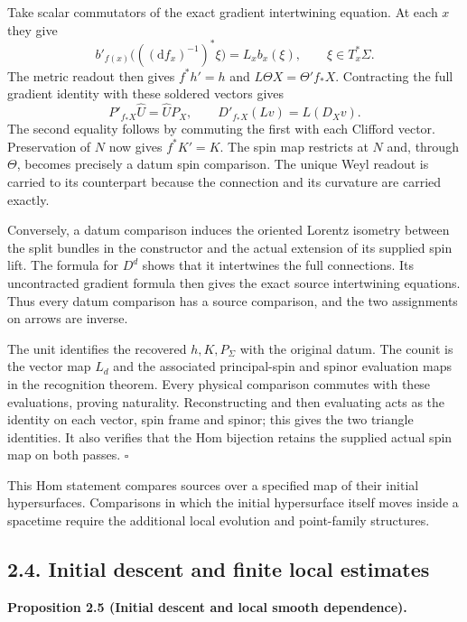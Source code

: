 \documentclass[
  english,
  11pt,
  reqno]{amsart}
\makeatletter
\newcommand{\paperdisplaynext}{%
  \let\paper@savedstartsection\@startsection
  \def\@startsection##1##2##3##4##5##6{%
    \let\@startsection\paper@savedstartsection
    \@tempskipa ##5\relax
    \ifdim\@tempskipa<\z@
      \def\paper@afterskip{.35\baselineskip}%
    \else
      \def\paper@afterskip{##5}%
    \fi
    \@startsection{##1}{##2}{##3}{##4}{\paper@afterskip}{##6}}}
\newcommand{\paperdisplaysection}{\paperdisplaynext\subsection}
\newcommand{\pandocstatementheading}[1]{%
  \par\if@nobreak\else
    \addpenalty{\@beginparpenalty}%
    \addvspace{.5\baselineskip plus .2\baselineskip minus .2\baselineskip}%
  \fi
  {\normalfont\bfseries #1\par}%
  \nobreak\@afterindenttrue\@afterheading
}
\let\paper@displaysection\paperdisplaysection
\renewcommand{\paperdisplaysection}[1]{%
  \let\paper@savedhangfrom\@hangfrom
  \long\def\@hangfrom##1##2{%
    \paper@savedhangfrom{##1}{\paper@headingparagraph##2}}%
  \paper@displaysection{#1}%
  \let\@hangfrom\paper@savedhangfrom}
\makeatother
\begin{document}
Take scalar commutators of the exact gradient intertwining equation. At
each \(x\) they give%
 \[
b'_{f(x)}
 \bigl(((\mathrm df_x)^{-1})^*\xi\bigr)
=L_xb_x(\xi),\qquad \xi\in T_x^*\Sigma.
\] The metric readout then gives \(f^*h'=h\) and
\(L\Theta X=\Theta'f_*X\). Contracting the full gradient identity with
these soldered vectors gives%
 \[
P'_{f_*X}\widehat U=\widehat U P_X,
\qquad
D'_{f_*X}(Lv)=L(D_Xv).
\] The second equality follows by commuting the first with each Clifford
vector. Preservation of \(N\) now gives \(f^*K'=K\). The spin map
restricts at \(N\) and, through \(\Theta\), becomes precisely a datum
spin comparison. The unique Weyl readout is carried to its counterpart
because the connection and its curvature are carried exactly.

Conversely, a datum comparison induces the oriented Lorentz isometry
between the split bundles in the constructor and the actual extension of
its supplied spin lift. The formula for \(D^d\) shows that it
intertwines the full connections. Its uncontracted gradient formula then
gives the exact source intertwining equations. Thus every datum
comparison has a source comparison, and the two assignments on arrows
are inverse.

The unit identifies the recovered \(h,K,P_\Sigma\) with the original
datum. The counit is the vector map \(L_d\) and the associated
principal-spin and spinor evaluation maps in the recognition theorem.
Every physical comparison commutes with these evaluations, proving
naturality. Reconstructing and then evaluating acts as the identity on
each vector, spin frame and spinor; this gives the two triangle
identities. It also verifies that the Hom bijection retains the supplied
actual spin map on both passes. \hfill\(\square\)

This Hom statement compares sources over a specified map of their
initial hypersurfaces. Comparisons in which the initial hypersurface
itself moves inside a spacetime require the additional local evolution
and point-family structures.

\paperdisplaysection{2.4. Initial descent and finite local
estimates}\label{initial-descent-and-finite-local-estimates}\label{sec:online-initial-descent-and-estimates}

\pandocstatementheading{\leavevmode{}\label{prop:online-initial-gradient-descent-families}Proposition 2.5 (Initial descent and local smooth dependence).}
\end{document}

